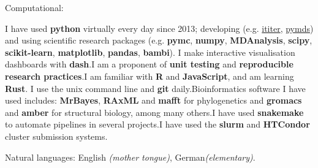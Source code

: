 \documentclass[10pt,a4paper]{article}
\begin{document}
\spacedhrule{0.9em}{-0.4em}


\inlineheadsection  %
{Computational:} {
  
  I have used \textbf{python} virtually every day since 2013; developing (e.g.\@
  \href{https://ititer.readthedocs.io/}{ititer},
  \href{https://pymds.readthedocs.io}{pymds}) and using scientific research packages
  (e.g. \textbf{pymc}, \textbf{numpy}, \textbf{MDAnalysis}, \textbf{scipy},
  \textbf{scikit-learn}, \textbf{matplotlib}, \textbf{pandas}, \textbf{bambi}). I make
  interactive visualisation dashboards with \textbf{dash}.\sbull I am a proponent of
  \textbf{unit testing} and \textbf{reproducible research practices}.\sbull I am familiar
  with \textbf{R} and \textbf{JavaScript}, and am learning \textbf{Rust}. \sbull I use
  the unix command line and \textbf{git} daily.\sbull Bioinformatics software I have used
  includes: \textbf{MrBayes}, \textbf{RAxML} and \textbf{mafft} for phylogenetics and
  \textbf{gromacs} and \textbf{amber} for structural biology, among many others.\sbull I
  have used \textbf{snakemake} to automate pipelines in several projects.\sbull I have
  used the \textbf{slurm} and \textbf{HTCondor} cluster submission systems.}

\vspace{0.5em}
\inlineheadsection
{Natural languages:}
{English \emph{(mother tongue)}, German\emph{(elementary)}.}

\spacedhrule{1.6em}{-0.4em}

\nocite{*}
\printbibliography[title=Publications]

\spacedhrule{1.6em}{-0.4em}
\end{document}
